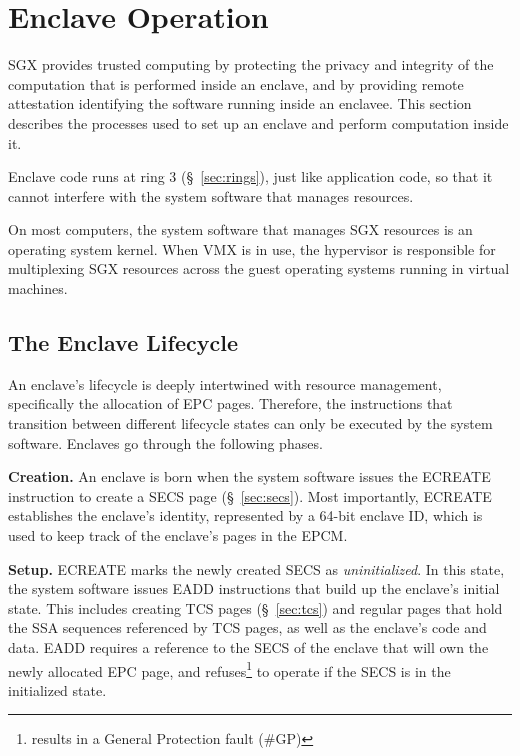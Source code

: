 \section{Enclave Operation}

SGX provides trusted computing by protecting the privacy and integrity of the
computation that is performed inside an enclave, and by providing remote
attestation identifying the software running inside an enclavee. This section
describes the processes used to set up an enclave and perform computation
inside it.


Enclave code runs at ring 3 (\S~\ref{sec:rings}), just like application code,
so that it cannot interfere with the system software that manages resources.


On most computers, the system software that manages SGX resources is an
operating system kernel. When VMX is in use, the hypervisor is responsible for
multiplexing SGX resources across the guest operating systems running in
virtual machines.

\subsection{The Enclave Lifecycle}
\label{sec:lifecycle}

An enclave's lifecycle is deeply intertwined with resource management,
specifically the allocation of EPC pages. Therefore, the instructions that
transition between different lifecycle states can only be executed by the
system software. Enclaves go through the following phases.


\textbf{Creation.} An enclave is born when the system software issues the
ECREATE instruction to create a SECS page (\S~\ref{sec:secs}). Most
importantly, ECREATE establishes the enclave's identity, represented by a
64-bit enclave ID, which is used to keep track of the enclave's pages in the
EPCM.

\textbf{Setup.} ECREATE marks the newly created SECS as \textit{uninitialized}.
In this state, the system software issues EADD instructions that build up the
enclave's initial state. This includes creating TCS pages (\S~\ref{sec:tcs})
and regular pages that hold the SSA sequences referenced by TCS pages, as well
as the enclave's code and data. EADD requires a reference to the SECS of the
enclave that will own the newly allocated EPC page, and
refuses\footnote{results in a General Protection fault (\#GP)} to operate if
the SECS is in the initialized state.

